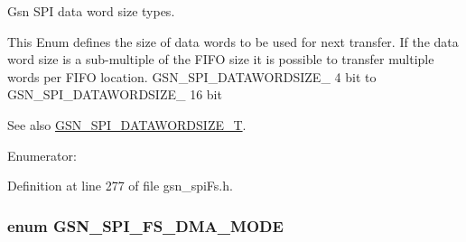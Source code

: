 Gsn SPI data word size types. 

This Enum defines the size of data words to be used for next transfer. If the data word size is a sub-\/multiple of the FIFO size it is possible to transfer multiple words per FIFO location. GSN\_\-SPI\_\-DATAWORDSIZE\_ 4 bit to GSN\_\-SPI\_\-DATAWORDSIZE\_ 16 bit

\begin{DoxySeeAlso}{See also}
\hyperlink{a00655_ga63cbe81427185213bde26b93dde72747}{GSN\_\-SPI\_\-DATAWORDSIZE\_\-T}. 
\end{DoxySeeAlso}
\begin{Desc}
\item[Enumerator: ]\par
\begin{description}
\item[{\em 
\hypertarget{a00655_gga14e8640824b36f8fbc046289a0fef146a2f3788be6ad47f636bdc56a18c3ae916}{
GSN\_\-SPI\_\-FS\_\-DATAWORDSIZE\_\-8}
\label{a00655_gga14e8640824b36f8fbc046289a0fef146a2f3788be6ad47f636bdc56a18c3ae916}
}]\item[{\em 
\hypertarget{a00655_gga14e8640824b36f8fbc046289a0fef146a37642fddaf6667dfed19bacf3bd21a75}{
GSN\_\-SPI\_\-FS\_\-DATAWORDSIZE\_\-16}
\label{a00655_gga14e8640824b36f8fbc046289a0fef146a37642fddaf6667dfed19bacf3bd21a75}
}]\end{description}
\end{Desc}



Definition at line 277 of file gsn\_\-spiFs.h.

\hypertarget{a00655_ga527bb8ce76fef8354e9db5ed16509e26}{
\subsubsection[{GSN\_\-SPI\_\-FS\_\-DMA\_\-MODE}]{\setlength{\rightskip}{0pt plus 5cm}enum {\bf GSN\_\-SPI\_\-FS\_\-DMA\_\-MODE}}}
\label{a00655_ga527bb8ce76fef8354e9db5ed16509e26}


